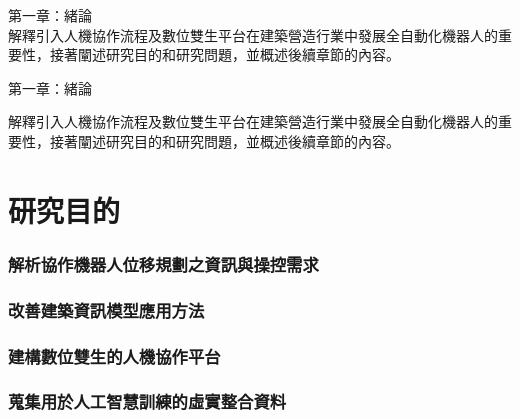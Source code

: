 {\highlight 第一章：緒論}\\ %
解釋引入人機協作流程及數位雙生平台在建築營造行業中發展全自動化機器人的重要性，接著闡述研究目的和研究問題，並概述後續章節的內容。

{\highlight 第一章：緒論} %

解釋引入人機協作流程及數位雙生平台在建築營造行業中發展全自動化機器人的重要性，接著闡述研究目的和研究問題，並概述後續章節的內容。

\section{研究目的}

\subsubsection{解析協作機器人位移規劃之資訊與操控需求}

\subsubsection{改善建築資訊模型應用方法}

\subsubsection{建構數位雙生的人機協作平台}

\subsubsection{蒐集用於人工智慧訓練的虛實整合資料}